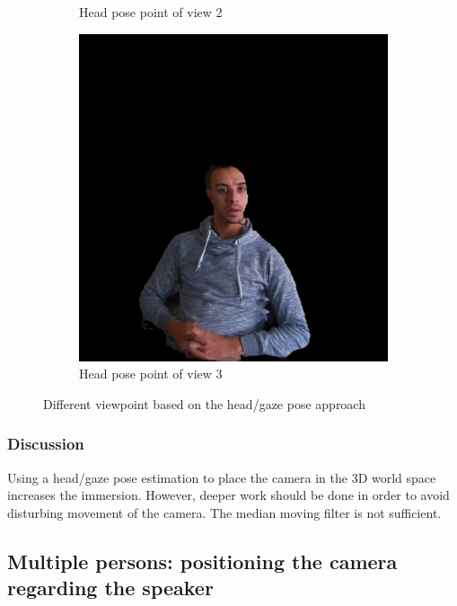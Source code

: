 \begin{figure}[H]
\begin{subfigure}[b]{0.32 \textwidth}
    \caption{Head pose point of view 2}
    \label{figure:00267_head}
  \end{subfigure}
  \hfill
  \begin{subfigure}[b]{0.32 \textwidth}
    \includegraphics[width=\textwidth]{images/scenario/00620_head.jpg}
    \caption{Head pose point of view 3}
    \label{figure:00620_head}
  \end{subfigure}
  \caption{Different viewpoint based on the head/gaze pose approach}
  \label{figure:diff_head_pose}
\end{figure}


\subsubsection{Discussion}

Using a head/gaze pose estimation to place the camera in the 3D world space increases the immersion. However, deeper work should be done in order to avoid disturbing movement of the camera. The median moving filter is not sufficient.



\subsection{Multiple persons: positioning the camera regarding the speaker}

